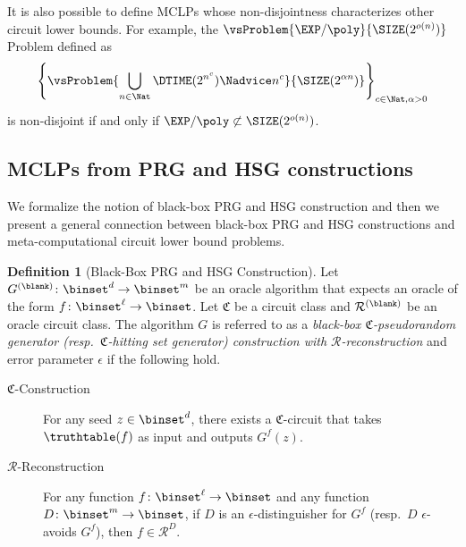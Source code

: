 \documentclass[11pt]{article}
\numberwithin{equation}{section}
\theoremstyle{definition}
\newtheorem{definition}[theorem]{Definition}
\theoremstyle{plain}
\begin{document}
It is also possible to define
MCLPs whose non-disjointness characterizes other circuit lower bounds.
For example,
the $\vsProblem{\EXP/\poly}{\SIZE(2^{o(n)})}$ Problem defined as $$\left\{ \vsProblem{\bigcup_{n \in \Nat}\DTIME(2^{n^c}) \Nadvice n^c}{\SIZE(2^{\alpha n})} \right\}_{c \in \Nat, \alpha > 0}$$
is non-disjoint if and only if $\EXP/\poly \not\subset \SIZE(2^{o(n)})$.



\subsection{MCLPs from PRG and HSG constructions}
\label{subsection_MCLPsFromPRG}

We formalize the notion of black-box PRG and HSG construction
and then we present a general connection
between
black-box PRG and HSG constructions
and
meta-computational circuit lower bound problems.

\begin{definition}
  [Black-Box PRG and HSG Construction]
  \label{def_BBConstruction}
  Let $G^{(\blank)} \colon \binset^d \to \binset^m$ be an oracle algorithm
  that expects an oracle of the form $f \colon \binset^\ell \to \binset$.
  Let $\mathfrak{C}$ be a circuit class and $\mathcal{R}^{(\blank)}$ be an oracle circuit class.
  The algorithm $G$ is referred to as
  a \emph{black-box $\mathfrak{C}$-pseudorandom generator
    (resp.\ $\mathfrak{C}$-hitting set generator)
    construction with $\mathcal{R}$-reconstruction} and error parameter $\epsilon$
  if the following hold.
  \begin{description}
    \item[$\mathfrak{C}$-Construction]
          For any seed $z \in \binset^d$,
          there exists a $\mathfrak{C}$-circuit
          that takes $\truthtable(f)$ as input
          and outputs $G^f(z)$.
    \item[$\mathcal{R}$-Reconstruction]
          For any function $f \colon \binset^\ell \to \binset$ and
          any function $D \colon \binset^m \to \binset$,
          if $D$ is an $\epsilon$-distinguisher for $G^f$
          (resp.\ $D$ $\epsilon$-avoids $G^f$),
          then $f \in \mathcal{R}^D$.
  \end{description}
\end{definition}
\end{document}
